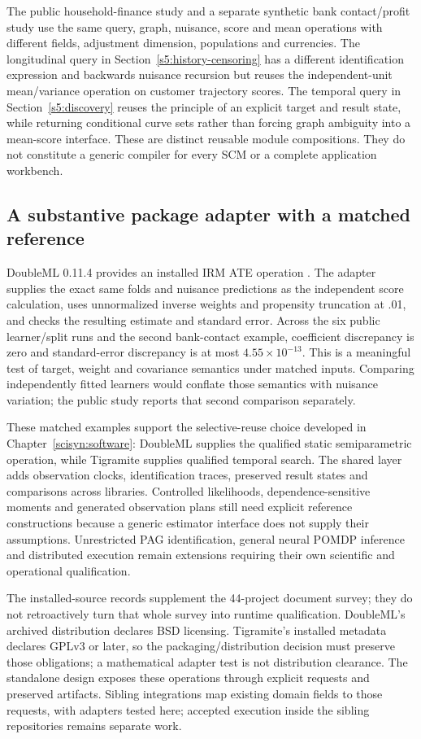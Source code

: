 The public household-finance study and a separate synthetic bank contact/profit
study use the same query, graph, nuisance, score and mean operations with
different fields, adjustment dimension, populations and currencies. The
longitudinal query in Section~\ref{s5:history-censoring} has a different
identification expression and backwards nuisance recursion but reuses the
independent-unit mean/variance operation on customer trajectory scores.
The temporal query in Section~\ref{s5:discovery} reuses the principle of an
explicit target and result state, while returning conditional curve sets
rather than forcing graph ambiguity into a mean-score interface. These are
distinct reusable module compositions. They do not constitute a generic
compiler for every SCM or a complete application workbench.

\subsection{A substantive package adapter with a matched reference}
DoubleML 0.11.4 provides an installed IRM ATE operation
\citep{doubleml2022,runtime_doubleml_scope}. The adapter supplies the exact
same folds and nuisance predictions as the independent score calculation,
uses unnormalized inverse weights and propensity truncation at .01, and
checks the resulting estimate and standard error. Across the six public
learner/split runs and the second bank-contact example, coefficient
discrepancy is zero and standard-error discrepancy is at most
$4.55\times10^{-13}$. This is a meaningful test of target, weight and
covariance semantics under matched inputs. Comparing independently fitted
learners would conflate those semantics with nuisance variation; the public
study reports that second comparison separately.

These matched examples support the selective-reuse choice developed in
Chapter~\ref{scisyn:software}: DoubleML supplies the qualified static
semiparametric operation, while Tigramite supplies qualified temporal search.
The shared layer adds observation clocks, identification traces, preserved
result states and comparisons across libraries. Controlled likelihoods,
dependence-sensitive moments and generated observation plans still need
explicit reference constructions because a generic estimator interface does
not supply their assumptions. Unrestricted PAG identification, general neural
POMDP inference and distributed execution remain extensions requiring their
own scientific and operational qualification.

The installed-source records supplement the 44-project document survey;
they do not retroactively turn that whole survey into runtime qualification.
DoubleML's archived distribution declares BSD licensing. Tigramite's
installed metadata declares GPLv3 or later, so the packaging/distribution
decision must preserve those obligations; a mathematical adapter test is
not distribution clearance. The standalone design exposes these operations
through explicit requests and preserved artifacts. Sibling integrations
map existing domain fields to those requests, with adapters tested here;
accepted execution inside the sibling repositories remains separate work.

